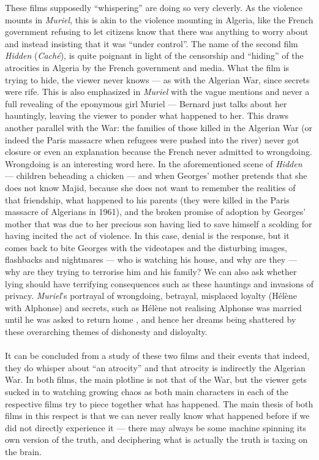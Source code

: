 \documentclass[12pt]{article}
\begin{document}
These films supposedly ``whispering'' are doing so very cleverly. As
the violence mounts in \textit{Muriel}, this is akin to the violence
mounting in Algeria, like the French government refusing to let
citizens know that there was anything to worry about and instead
insisting that it was ``under control''. The name of the second film
\textit{Hidden} (\textit{Caché}), is quite poignant in light of the
censorship and ``hiding'' of the atrocities in Algeria by the French
government and media. What the film is trying to hide, the viewer
never knows --- as with the Algerian War, since secrets were rife.
This is also emphasized in \textit{Muriel} with the vague mentions and
never a full revealing of the eponymous girl Muriel --- Bernard just
talks about her hauntingly, leaving the viewer to ponder what happened
to her. This draws another parallel with the War: the families of
those killed in the Algerian War (or indeed the Paris massacre when
refugees were pushed into the river) never got closure or even an
explanation because the French never admitted to wrongdoing.\\

Wrongdoing is an interesting word here. In the aforementioned scene of
\textit{Hidden} --- children beheading a chicken --- and when Georges'
mother pretends that she does not know Majid, because she does not
want to remember the realities of that friendship, what happened to
his parents (they were killed in the Paris massacre of Algerians in
1961), and the broken promise of adoption by Georges' mother that was
due to her precious son having lied to save himself a scolding for
having incited the act of violence. In this case, denial is the
response, but it comes back to bite Georges with the videotapes and
the disturbing images, flashbacks and nightmares --- who is watching
his house, and why are they --- why are they trying to terrorise him
and his family? We can also ask whether lying should have terrifying
consequences such as these hauntings and invasions of privacy.
\textit{Muriel}'s portrayal of wrongdoing, betrayal, misplaced loyalty
(Hélène with Alphonse) and secrets, such as Hélène not realising
Alphonse was married until he was asked to return home
\citep{muriel-blog}, and hence her dreams being shattered by these
overarching themes of dishonesty and disloyalty.\\\\

It can be concluded from a study of these two films and their events
that indeed, they do whisper about ``an atrocity'' and that atrocity
is indirectly the Algerian War. In both films, the main plotline is
not that of the War, but the viewer gets sucked in to watching growing
chaos as both main characters in each of the respective films try to
piece together what has happened. The main thesis of both films in
this respect is that we can never really know what happened before if
we did not directly experience it --- there may always be some machine
spinning its own version of the truth, and deciphering what is
actually the truth is taxing on the brain.



\end{document}
